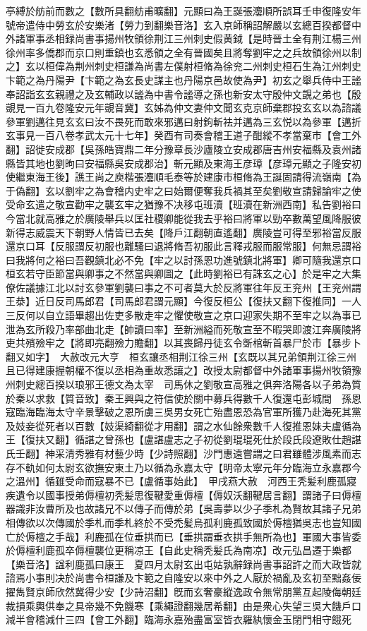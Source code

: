 亭縛於舫前而數之【數所具翻舫甫曠翻】元顯曰為王誕張灋順所誤耳壬申復隆安年號帝遣侍中勞玄於安樂渚【勞力到翻樂音洛】玄入京師稱詔解嚴以玄總百揆都督中外諸軍事丞相録尚書事揚州牧領徐荆江三州刺史假黄鉞【是時晉土全有荆江楊三州徐州率多僑郡而京口則重鎮也玄悉領之全有晉國矣且將奪劉牢之之兵故領徐州以制之】玄以桓偉為荆州刺史桓謙為尚書左僕射桓脩為徐兖二州刺史桓石生為江州刺史卞範之為丹陽尹【卞範之為玄長史謀主也丹陽京邑故使為尹】初玄之舉兵侍中王謐奉詔詣玄玄親禮之及玄輔政以謐為中書令謐導之孫也新安太守殷仲文覬之弟也【殷覬見一百九卷隆安元年覬音冀】玄姊為仲文妻仲文聞玄克京師棄郡投玄玄以為諮議參軍劉邁往見玄玄曰汝不畏死而敢來邪邁曰射鉤斬袪并邁為三玄悦以為參軍【邁折玄事見一百八卷孝武太元十七年】癸酉有司奏會稽王道子酣縱不孝當棄市【會工外翻】詔徙安成郡【吳孫皓寶鼎二年分豫章長沙廬陵立安成郡唐吉州安福縣及袁州諸縣皆其地也劉昫曰安福縣吳安成郡治】斬元顯及東海王彦璋【彦璋元顯之子隆安初使繼東海王後】譙王尚之庾楷張灋順毛泰等於建康市桓脩為王誕固請得流嶺南【為于偽翻】玄以劉牢之為會稽内史牢之曰始爾便奪我兵禍其至矣劉敬宣請歸諭牢之使受命玄遣之敬宣勸牢之襲玄牢之猶豫不决移屯班瀆【班瀆在新洲西南】私告劉裕曰今當北就高雅之於廣陵舉兵以匡社稷卿能從我去乎裕曰將軍以勁卒數萬望風降服彼新得志威震天下朝野人情皆已去矣【降戶江翻朝直遙翻】廣陵豈可得至邪裕當反服還京口耳【反服謂反初服也離騷曰退將脩吾初服此言釋戎服而服常服】何無忌謂裕曰我將何之裕曰吾觀鎮北必不免【牢之以討孫恩功進號鎮北將軍】卿可隨我還京口桓玄若守臣節當與卿事之不然當與卿圖之【此時劉裕已有誅玄之心】於是牢之大集僚佐議據江北以討玄參軍劉襲曰事之不可者莫大於反將軍往年反王兖州【王兖州謂王㳟】近日反司馬郎君【司馬郎君謂元顯】今復反桓公【復扶又翻下復推同】一人三反何以自立語畢趨出佐吏多散走牢之懼使敬宣之京口迎家失期不至牢之以為事已泄為玄所殺乃率部曲北走【帥讀曰率】至新洲縊而死敬宣至不暇哭即渡江奔廣陵將吏共殯殮牢之【將即亮翻殮力贍翻】以其喪歸丹徒玄令斲棺斬首暴尸於市【暴步卜翻又如字】　大赦改元大亨　桓玄讓丞相荆江徐三州【玄既以其兄弟領荆江徐三州且已得建康握朝權不復以丞相為重故悉讓之】改授太尉都督中外諸軍事揚州牧領豫州刺史總百揆以琅邪王德文為太宰　司馬休之劉敬宣高雅之俱奔洛陽各以子弟為質於秦以求救【質音致】秦王興與之符信使於關中募兵得數千人復還屯彭城間　孫恩寇臨海臨海太守辛景擊破之恩所虜三吳男女死亡殆盡恩恐為官軍所獲乃赴海死其黨及妓妾從死者以百數【妓渠綺翻從才用翻】謂之水仙餘衆數千人復推恩妹夫盧循為王【復扶又翻】循諶之曾孫也【盧諶盧志之子初從劉琨琨死仕於段氏段遼敗仕趙諶氏壬翻】神采清秀雅有材藝少時【少詩照翻】沙門惠遠嘗謂之曰君雖體涉風素而志存不軌如何太尉玄欲撫安東土乃以循為永嘉太守【明帝太寧元年分臨海立永嘉郡今之溫州】循雖受命而寇暴不已【盧循事始此】　甲戌燕大赦　河西王秃髪利鹿孤寢疾遺令以國事授弟傉檀初秃髪思復鞬愛重傉檀【傉奴沃翻鞬居言翻】謂諸子曰傉檀器識非汝曹所及也故諸兄不以傳子而傳於弟【吳壽夢以少子季札為賢故其諸子兄弟相傳欲以次傳國於季札而季札終於不受禿髪烏孤利鹿孤致國於傉檀猶吳志也豈知國亡於傉檀之手哉】利鹿孤在位垂拱而已【垂拱謂垂衣拱手無所為也】軍國大事皆委於傉檀利鹿孤卒傉檀襲位更稱凉王【自此史稱秃髪氏為南凉】改元弘昌遷于樂都【樂音洛】諡利鹿孤曰康王　夏四月太尉玄出屯姑孰辭録尚書事詔許之而大政皆就諮焉小事則决於尚書令桓謙及卞範之自隆安以來中外之人厭於禍亂及玄初至黜姦佞擢雋賢京師欣然冀得少安【少詩沼翻】旣而玄奢豪縱逸政令無常朋黨互起陵侮朝廷裁損乘輿供奉之具帝幾不免饑寒【乘繩證翻幾居希翻】由是衆心失望三吳大饑戶口減半會稽減什三四【會工外翻】臨海永嘉殆盡富室皆衣羅紈懷金玉閉門相守餓死